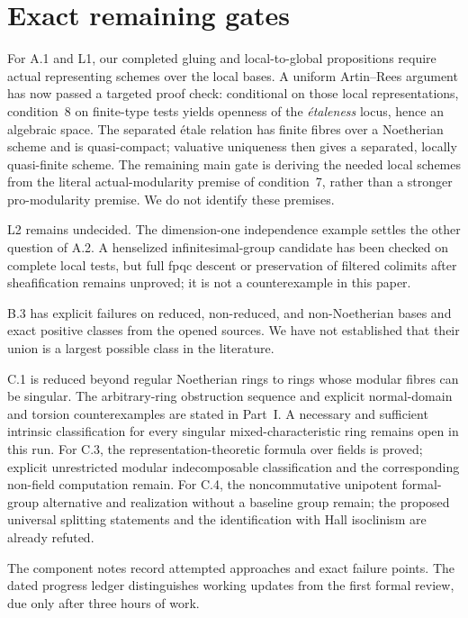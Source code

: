 \section{Exact remaining gates}
For A.1 and L1, our completed gluing and local-to-global propositions require
actual representing schemes over the local bases. A uniform Artin--Rees
argument has now passed a targeted proof check: conditional on those local
representations, condition~8 on finite-type tests yields openness of the
\emph{\'etaleness} locus, hence an algebraic space. The separated \'etale
relation has finite fibres over a Noetherian scheme and is quasi-compact;
valuative uniqueness then gives a separated, locally quasi-finite scheme.
The remaining main gate is deriving the needed local schemes from the literal
actual-modularity premise of condition~7, rather than a stronger
pro-modularity premise. We do not identify these premises.

L2 remains undecided. The dimension-one independence example settles the
other question of A.2. A henselized infinitesimal-group candidate has been
checked on complete local tests, but full fpqc descent or preservation of
filtered colimits after sheafification remains unproved; it is not a
counterexample in this paper.

B.3 has explicit failures on reduced, non-reduced, and non-Noetherian bases
and exact positive classes from the opened sources. We have not established
that their union is a largest possible class in the literature.

C.1 is reduced beyond regular Noetherian rings to rings whose modular fibres
can be singular. The arbitrary-ring obstruction sequence and explicit
normal-domain and torsion counterexamples are stated in Part~I. A necessary
and sufficient intrinsic classification for every singular mixed-characteristic
ring remains open in this run. For C.3, the representation-theoretic formula
over fields is proved; explicit unrestricted modular indecomposable
classification and the corresponding non-field computation remain.
For C.4, the noncommutative unipotent formal-group alternative and realization
without a baseline group remain; the proposed universal splitting statements
and the identification with Hall isoclinism are already refuted.

The component notes record attempted approaches and exact failure points.
The dated progress ledger distinguishes working updates from the first
formal review, due only after three hours of work.
